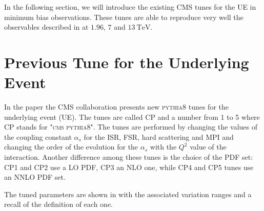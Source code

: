 In the following section, we will introduce the existing CMS tunes for the  UE in minimum bias observations. These tunes are able to reproduce very well the observables described in  at $1.96$, $7$ and $13\ \mathrm{TeV}$. 


\section{Previous Tune for the Underlying Event}

In the paper \cite{CPtunes} the CMS collaboration presents new \textsc{pythia8} tunes for the underlying event (UE). The tunes are called CP and a number from 1 to 5 where CP stands for \textsc{"cms pythia8"}. The tunes are performed by changing the values of the coupling constant $\alpha_s$ for the ISR, FSR, hard scattering and MPI and changing the order of the evolution for the $\alpha_s$ with the $Q^2$ value of the interaction. Another difference among these tunes is the choice of the PDF set: CP1 and CP2 use a LO PDF, CP3 an NLO one, while CP4 and CP5 tunes use an NNLO PDF set. 

The tuned parameters are shown in  with the associated variation ranges and a recall of the definition of each one. 
\begin{table}[H]
	\centering
	\caption{This table reports the five parameters tuned for the UE and Minimum Bias in CP* tunes, the variation ranges used for the sampling are shown in the last column. Table from \cite{CPtunes}}
	\label{table:CP5variations}
\end{table}

